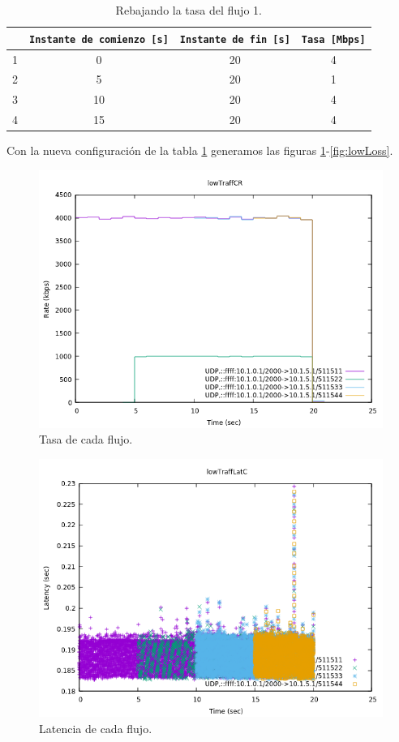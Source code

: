 \documentclass[11pt]{article}
\begin{document}
        \begin{table}
            \centering
            \begin{tabular}{|c|c|c|c|}
                \hline
                & \texttt{Instante de comienzo [s]} & \texttt{Instante de fin [s]} & \texttt{Tasa [Mbps]}\\
                \hline
                1 & 0 & 20 & 4\\
                \hline
                2 & 5 & 20 & 1\\
                \hline
                3 & 10 & 20 & 4\\
                \hline
                4 & 15 & 20 & 4\\
                \hline
            \end{tabular}
            \caption{Rebajando la tasa del flujo 1.}
            \label{tab:low_conf}
        \end{table}

        Con la nueva configuración de la tabla \ref{tab:low_conf} generamos las figuras \ref{fig:lowR}-\ref{fig:lowLoss}.

        \begin{figure}
            \centering
            \includegraphics[width=0.6\linewidth]{lowTraffR.png}
            \caption{Tasa de cada flujo.}
            \label{fig:lowR}
        \end{figure}

        \begin{figure}
            \centering
            \includegraphics[width=0.6\linewidth]{lowTraffLat.png}
            \caption{Latencia de cada flujo.}
            \label{fig:lowLat}
        \end{figure}
\end{document}
